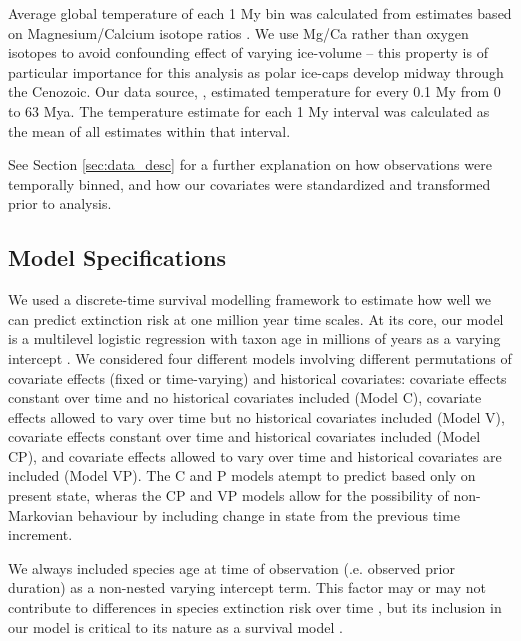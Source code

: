 \documentclass[12pt,letterpaper]{article}
\begin{document}
\begin{refsection}
Average global temperature of each 1 My bin was calculated from estimates based on Magnesium/Calcium isotope ratios \citet{Cramer2011}. We use Mg/Ca rather than oxygen isotopes to avoid confounding effect of varying ice-volume -- this property is of particular importance for this analysis as polar ice-caps develop midway through the Cenozoic. Our data source, \citet{Cramer2011}, estimated temperature for every 0.1 My from 0 to 63 Mya. The temperature estimate for each 1 My interval was calculated as the mean of all estimates within that interval. 

See Section \ref{sec:data_desc} for a further explanation on how observations were temporally binned, and how our covariates were standardized and transformed prior to analysis.




\subsection{Model Specifications}

We used a discrete-time survival modelling framework to estimate how well we can predict extinction risk at one million year time scales. At its core, our model is a multilevel logistic regression with taxon age in millions of years as a varying intercept \citep{Tutz2016}. We considered four different models involving different permutations of covariate effects (fixed or time-varying) and historical covariates: covariate effects constant over time and no historical covariates included (Model C), covariate effects allowed to vary over time but no historical covariates included (Model V), covariate effects constant over time and historical covariates included (Model CP), and covariate effects allowed to vary over time and historical covariates are included (Model VP). The C and P models atempt to predict based only on present state, wheras the CP and VP models allow for the possibility of non-Markovian behaviour by including change in state from the previous time increment.

We always included species age at time of observation (.e. observed prior duration) as a non-nested varying intercept term. This factor may or may not contribute to differences in species extinction risk over time \citep{Smits2015,Finnegan2008,Ezard2012,VanValen1973,Liow2011,Crampton2016}, but its inclusion in our model is critical to its nature as a survival model \cite{Tutz2016}.


\end{refsection}
\end{document}
